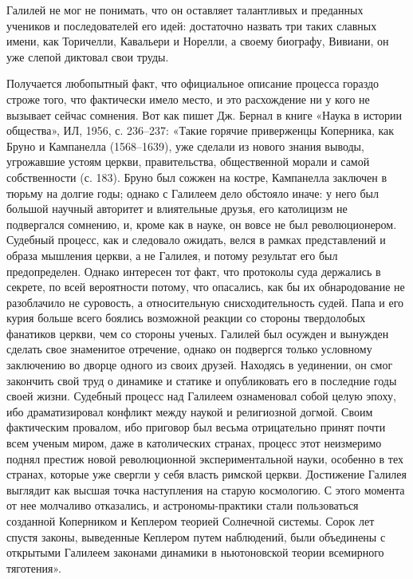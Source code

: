 Галилей не мог  не понимать, что он оставляет  талантливых и преданных
учеников  и  последователей его  идей:  достаточно  назвать три  таких
славных имени, как Торичелли, Кавальери  и Норелли, а своему биографу,
Вивиани, он уже слепой диктовал свои труды.

Получается любопытный факт, что  официальное описание процесса гораздо
строже того, что  фактически имело место, и это расхождение  ни у кого
не вызывает сейчас сомнения. Вот как пишет Дж. Бернал в книге «Наука в
истории общества»,  ИЛ, 1956, с. 236--237:  «Такие горячие приверженцы
Коперника, как Бруно и Кампанелла  (1568--1639), уже сделали из нового
знания выводы,  угрожавшие устоям церкви,  правительства, общественной
морали и  самой собственности  (с. 183). Бруно  был сожжен  на костре,
Кампанелла заключен  в тюрьму на  долгие годы; однако с  Галилеем дело
обстояло иначе:  у него  был большой  научный авторитет  и влиятельные
друзья, его католицизм не подвергался  сомнению, и, кроме как в науке,
он  вовсе не  был революционером.  Судебный процесс,  как и  следовало
ожидать, велся в  рамках представлений и образа мышления  церкви, а не
Галилея, и  потому результат  его был предопределен.  Однако интересен
тот факт, что протоколы суда  держались в секрете, по всей вероятности
потому,  что опасались,  как  бы их  обнародование  не разоблачило  не
суровость,  а  относительную  снисходительность   судей.  Папа  и  его
курия больше  всего боялись  возможной реакции со  стороны твердолобых
фанатиков  церкви,  чем  со  стороны ученых.  Галилей  был  осужден  и
вынужден сделать свое знаменитое отречение, однако он подвергся только
условному  заключению во  дворце одного  из своих  друзей. Находясь  в
уединении,  он  смог  закончить  свой  труд о  динамике  и  статике  и
опубликовать его  в последние годы  своей жизни. Судебный  процесс над
Галилеем ознаменовал  собой целую  эпоху, ибо  драматизировал конфликт
между  наукой и  религиозной догмой.  Своим фактическим  провалом, ибо
приговор был весьма отрицательно принят  почти всем ученым миром, даже
в католических  странах, процесс этот неизмеримо  поднял престиж новой
революционной экспериментальной науки, особенно в тех странах, которые
уже свергли у себя власть  римской церкви. Достижение Галилея выглядит
как высшая точка наступления на  старую космологию. С этого момента от
нее  молчаливо  отказались,  и астрономы-практики  стали  пользоваться
созданной Коперником  и Кеплером теорией Солнечной  системы. Сорок лет
спустя законы, выведенные Кеплером путем наблюдений, были объединены с
открытыми Галилеем законами динамики  в ньютоновской теории всемирного
тяготения».

